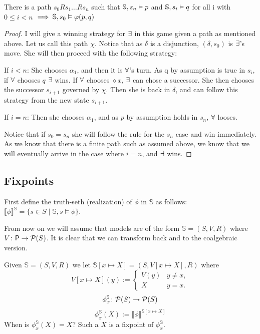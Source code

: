 \begin{theorem}
 There is a path $s_0Rs_1 \dots Rs_n$ such that $\mathbb{S},s_n \vDash p$  and $\mathbb{S},s_i
 \vDash q$ for all i with $0\leq i < n$ $\implies \mathbb{S},s_0 \vDash \varphi(p,q)$
\end{theorem}

\begin{proof}
  I will give a winning strategy for $\exists$ in this game given a path as
  mentioned above. Let us call this path $\chi$. Notice that as $\delta$ is a
  disjunction, $(\delta,s_0)$ is $\exists$'s move. She will then proceed with the following
  strategy:
  \begin{list}{}{}
  \item If $i<n$: She chooses $\alpha_1$, and then it is $\forall$'s turn. As q by assumption is true in $s_i$,
    if $\forall$ chooses $q$ $\exists$ wins. If $\forall$ chooses $\diamond x$, $\exists$ can chose a
    successor. She then chooses the successor $s_{i+1}$ governed by $\chi$. Then she is back in
    $\delta$, and can follow this strategy from the new state $s_{i+1}$.
  \item If $i=n$: Then she chooses $\alpha_1$, and as $p$ by assumption holds in
    $s_n$, $\forall$ looses.
\end{list}
Notice that if $s_0=s_n$ she will follow the rule for the $s_n$ case and win immediately.
As we know that there is a finite path such as assumed above, we know that we
will eventually arrive in the case where $i=n$, and $\exists$ wins.
\end{proof}

\subsection{Fixpoints}
\label{sec:fixpoints}
First define the truth-seth (realization) of $\phi$ in $\mathbb{S}$ as follows:
$\llbracket \phi \rrbracket^{\mathbb{S}} = \{ s \in S \mid \mathbb{S},s \models \phi \}$.

From now on we will assume that models are of the form $\mathbb{S} = (S,V,R)$
where $V \colon \mathsf{P} \to \mathcal{P}(S)$. It is clear that we can transform back and to the
coalgebraic version. 

Given $\mathbb{S} = (S,V,R)$ we let $\mathbb{S}[x\mapsto X]=(S,V[x\mapsto X],R)$ where
\[V[x\mapsto X](y) :=
\begin{cases}
  V(y) & y\neq x,\\
  X & y=x.
\end{cases}\]
\[\phi^{\mathbb{S}}_{x} \colon \mathcal{P}(S) \to \mathcal{P}(S)\]
\[\phi^{\mathbb{S}}_{x}(X) := \llbracket \phi \rrbracket ^{\mathbb{S}[x \mapsto X]}\]
When is $\phi^{\mathbb{S}}_{x}(X) = X$? Such a $X$ is a fixpoint of $\phi^{\mathbb{S}}_{x}$.

